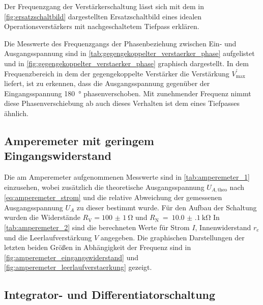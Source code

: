 Der Frequenzgang der Verstärkerschaltung lässt sich mit dem in 
\cref{fig:ersatzschaltbild} dargestellten Ersatzschaltbild eines idealen 
Operationsverstärkers 
mit nachgeschaltetem Tiefpass erklären.



Die Messwerte des Frequenzgangs der Phasenbeziehung zwischen Ein- und 
Ausgangsspannung sind in \cref{tab:gegengekoppelter_verstaerker_phase}
aufgelistet und in \cref{fig:gegengekoppelter_verstaerker_phase} graphisch 
dargestellt. In dem Frequenzbereich in dem der gegengekoppelte Verstärker die Verstärkung
$V^{\prime}_{\mathrm{max}}$ liefert, ist zu erkennen, dass die Ausgangsspannung gegenüber der 
Eingangsspannung \SI{180}{\degree} phasenverschoben. Mit zunehmender Frequenz nimmt diese 
Phasenverschiebung ab auch dieses Verhalten ist dem eines Tiefpasses ähnlich.  








\subsection{Amperemeter mit geringem Eingangswiderstand}

Die am Amperemeter aufgenommenen Messwerte sind in \cref{tab:amperemeter_1}
einzusehen, wobei zusätzlich die theoretische Ausgangsspannung 
$U_{A,\mathrm{theo}}$ nach \cref{eq:amperemeter_strom}
und die relative Abweichung der gemessenen Ausgangsspannung $U_A$ zu dieser 
bestimmt wurde. Für den Aufbau der Schaltung wurden die Widerstände
$R_{\mathrm{V}} = \SI{100(1)}{\ohm}$ und $R_{\mathrm{N}}~=~\SI{10.0(1)}{\kilo\ohm}$ 
In  \cref{tab:amperemeter_2} sind die berechneten Werte für Strom $I$, 
Innenwiderstand $r_e$ und die Leerlaufverstärkung $V$ angegeben. 
Die graphischen Darstellungen der letzten beiden Größen in Abhängigkeit der
Frequenz sind in 
\cref{fig:amperemeter_eingangswiderstand} und 
\cref{fig:amperemeter_leerlaufverstaerkung} gezeigt.








\subsection{Integrator- und Differentiatorschaltung}

